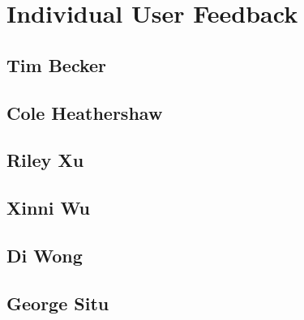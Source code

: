 \documentclass[11pt]{article}
\begin{document}
\section*{Individual User Feedback}

\subsection*{Tim Becker}

\subsection*{Cole Heathershaw}

\subsection*{Riley Xu}

\subsection*{Xinni Wu}

\subsection*{Di Wong}

\subsection*{George Situ}
\end{document}
